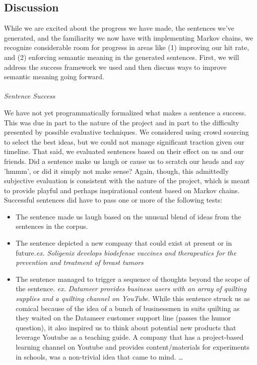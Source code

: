 \documentclass[11pt]{article}
\begin{document}
\subsection{Discussion}

While we are excited about the progress we have made, the sentences we've generated, and the familiarity we now have with implementing Markov chains, we recognize considerable room for progress in areas like (1) improving our hit rate, and (2) enforcing semantic meaning in the generated sentences. First, we will address the success framework we used and then discuss ways to improve semantic meaning going forward. 
\\\\
\textit{Sentence Success}

We have not yet programmatically formalized what makes a sentence a success. This was due in part to the nature of the project and in part to the difficulty presented by possible evaluative techniques. We considered using crowd sourcing to select the best ideas, but we could not manage significant traction given our timeline. That said, we evaluated sentences based on their effect on us and our friends. Did a sentence make us laugh or cause us to scratch our heads and say 'hmmm', or did it simply not make sense? Again, though, this admittedly subjective evaluation is consistent with the nature of the project, which is meant to provide playful and perhaps inspirational content based on Markov chains. Successful sentences did have to pass one or more of the following tests:
\begin{itemize}

        \item The sentence made us laugh based on the unusual blend of ideas from the sentences in the corpus.

        \item The sentence depicted a new company that could exist at present or in future.\textit{ex. Soligenix develops biodefense vaccines and therapeutics for the prevention and treatment of breast tumors} 

        \item The sentence managed to trigger a sequence of thoughts beyond the scope of the sentence. \textit{ex. Datameer provides business users with an array of quilting supplies and a quilting channel on YouTube.} While this sentence struck us as comical because of the idea of a bunch of businessmen in suits quilting as they waited on the Datameer customer support line (passes the humor question), it also inspired us to think about potential new products that leverage Youtube as a teaching guide. A company that has a project-based learning channel on Youtube and provides content/materials for experiments in schools, was a non-trivial idea that came to mind. \ldots 

\end{itemize}
\end{document}
